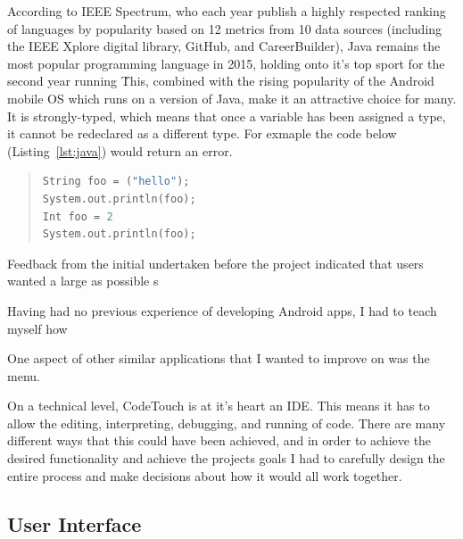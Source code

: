 \documentclass[ %
                    author={Jonathan Rankin},
                supervisor={Dr. David May, Dr. Ian Holyer},
                    degree={MEng},
                     title={CodeTouch},
                  subtitle={A Revolutionary Way To Program Real Code On Touch Screen Devices},
                      type={enterprise},
                      year={2015 } ]{dissertation}
\begin{document}
According to IEEE Spectrum, who each year publish a highly respected ranking of languages by popularity based on 12 metrics from 10 data sources (including the IEEE Xplore digital library, GitHub, and CareerBuilder), Java remains the most popular programming language in 2015, holding onto it's top sport for the second year running \cite{top}\. This, combined with the rising popularity of the Android mobile OS which runs on a version of Java, make it an attractive choice for many. It is strongly-typed, which means that once a variable has been assigned a type, it cannot be redeclared as a different type. For exmaple the code below (Listing~\ref{lst:java}) would return an error.

\begin{quote}
\begin{lstlisting}[caption={Example Java code},label={lst:java},language=Python]
String foo = ("hello");
System.out.println(foo);
Int foo = 2
System.out.println(foo);
\end{lstlisting}
\label{lst:label}
\end{quote}




Feedback from the initial undertaken before the project indicated that users wanted a large as possible s


Having had no previous experience of developing Android apps, I had to teach myself how 

One aspect of other similar applications that I wanted to improve on was the menu. 


On a technical level, CodeTouch is at it's heart an IDE. This means it has to allow the editing, interpreting, debugging, and running of code. There are many different ways that this could have been achieved, and in order to achieve the desired functionality and achieve the projects goals I had to carefully design the entire process and make decisions about how it would all work together. 




\subsection{User Interface}

\subsection{}
\end{document}
